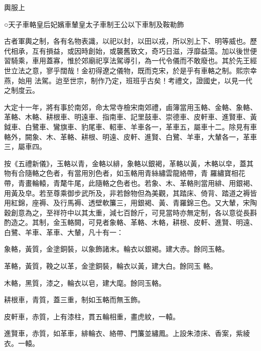 
\begin{pinyinscope}

 輿服上



 ○天子車輅皇后妃嬪車輦皇太子車制王公以下車制及鞍勒飾



 古者軍輿之制，各有名物表識，以祀以封，以田以戎，所以別上下、明等威也。歷代相承，互有損益，或因時創始，或襲舊致文，奇巧日滋，浮靡益蕩。加以後世便習騎乘，車用蓋寡，惟於郊廟祀享法駕導引，為一代令儀而不敢廢也。其於先王經世立法之意，寥乎闊哉！金初得遼之儀物，既而克宋，於是乎有車輅之制。熙宗幸燕，始用
 法駕。迨至世宗，制作乃定，班班乎古矣！考禮文，證國史，以見一代之制度云。



 大定十一年，將有事於南郊，命太常寺檢宋南郊禮，鹵簿當用玉輅、金輅、象輅、革輅、木輅、耕根車、明遠車、指南車、記里鼓車、崇德車、皮軒車、進賢車、黃鉞車、白鷺車、鸞旗車、豹尾車、軺車、羊車各一，革車五，屬車十二。除見有車輅外，闕象、木、革輅、耕根、明遠、皮軒、進賢、白鷺、羊車，大輦各一，革車三，屬車四。



 按《五禮新儀》，玉輅以青，金輅以緋，象輅以銀褐，革輅以黃，木輅以皁，蓋其物有合隨輅之色者，有當用別色者，如玉輅用青絲繡雲龍絡帶，青
 羅繡寶相花帶，青畫輪轅，青氂牛尾，此隨輅之色者也。若象、木、革輅則當用緋、用銀褐、用黃及皁。若至尊乘御步武所及，非若餘物但為美觀，其踏床、倚背、踏道之褥皆用紅錦，座褥、及行馬褥、透壁軟簾三，用銀褐、黃、青羅錦三色。又大輦，宋陶穀創意為之，至祥符中以其太重，減七百餘斤，可見當時亦無定制，各以意從長斟酌造之。其制，金玉輅闕，可見者象輅、革輅、木輅，耕根、皮軒、進賢、明遠、白鷺、羊車、革車、大輦，凡十有一：



 象輅，黃質，金塗銅裝，以象飾諸末。輪衣以銀褐。建大赤。餘同玉輅。



 革輅，黃質，鞔之以革，金塗銅裝，輪衣以黃，建大白。餘同玉
 輅。



 木輅，黑質，漆之，輪衣以皂，建大麾。餘同玉輅。



 耕根車，青質，蓋三重，制如玉輅而無玉飾。



 皮軒車，赤質，上有漆柱，貫五輪相重，畫虎紋，一轅。



 進賢車，赤質，如革車，緋輪衣、絡帶、門簾並繡鳳。上設朱漆床、香案，紫綾衣。一轅。




\end{pinyinscope}
